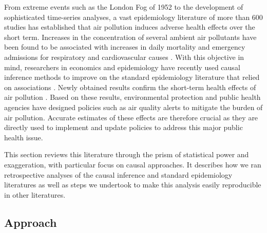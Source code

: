 \documentclass[12pt]{article}
\begin{document}
	From extreme events such as the London Fog of 1952 to the development of sophisticated time-series analyses, a vast epidemiology literature of more than 600 studies has established that air pollution induces adverse health effects over the short term. Increases in the concentration of several ambient air pollutants have been found to be associated with increases in daily mortality and emergency admissions for respiratory and cardiovascular causes \citep{schwartz_what_1994, samet_national_2000, letertre_shortterm_2002, bell_time-series_2004, liu_ambient_2019}. With this objective in mind, researchers in economics and epidemiology have recently used causal inference methods to improve on the standard epidemiology literature that relied on associations \citep{dominici_best_2017, bind_causal_2019}. Newly obtained results confirm the short-term health effects of air pollution \citep{schwartz_estimating_2015, schwartz_national_2018, deryugina_mortality_2019}. Based on these results, environmental protection and public health agencies have designed policies such as air quality alerts to mitigate the burden of air pollution. Accurate estimates of these effects are therefore crucial as they are directly used to implement and update policies to address this major public health issue.
	
	This section reviews this literature through the prism of statistical power and exaggeration, with particular focus on causal approaches. It describes how we ran retrospective analyses of the causal inference and standard epidemiology literatures as well as steps we undertook to make this analysis easily reproducible in other literatures.
    
    \subsection{Approach}
    
\end{document}

